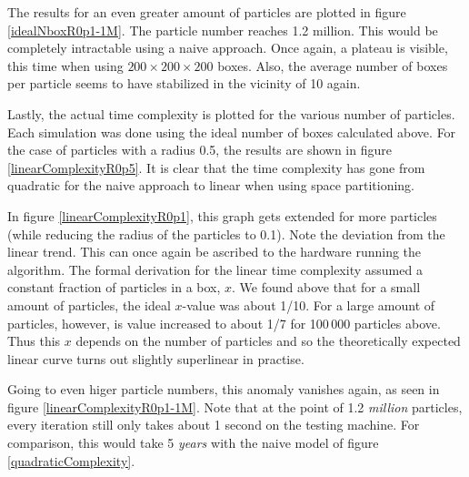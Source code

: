 The results for an even greater amount of particles are plotted in figure 
\ref{idealNboxR0p1-1M}. The particle number reaches 1.2 million. This would 
be completely intractable using a naive approach. Once again, a plateau is 
visible, this time when using $200 \times 200 \times 200$ boxes. Also, the 
average number of boxes per particle seems to have stabilized in the 
vicinity of 10 again.



Lastly, the actual time complexity is plotted for the various number of 
particles. Each simulation was done using the ideal number of boxes 
calculated above. For the case of particles with a radius 0.5, the results 
are shown in figure \ref{linearComplexityR0p5}. It is clear that the time 
complexity has gone from quadratic for the naive approach to linear when 
using space partitioning.




In figure \ref{linearComplexityR0p1}, this graph gets extended for more 
particles (while reducing the radius of the particles to 0.1). Note the 
deviation from the linear trend. This can once again be ascribed to the 
hardware running the algorithm. The formal derivation for the linear time 
complexity assumed a constant fraction of particles in a box, $x$. We found 
above that for a small amount of particles, the ideal $x$-value was about 
1/10. For a large amount of particles, however, is value increased to about 
1/7 for 100\,000 particles above. Thus this $x$ depends on the number of 
particles and so the theoretically expected linear curve turns out slightly 
superlinear in practise.

Going to even higer particle numbers, this anomaly vanishes again, as seen 
in figure \ref{linearComplexityR0p1-1M}. Note that at the point of 1.2 
\emph{million} particles, every iteration still only takes about 1 second on 
the testing machine. For comparison, this would take 5 \emph{years} with the 
naive model of figure \ref{quadraticComplexity}.




